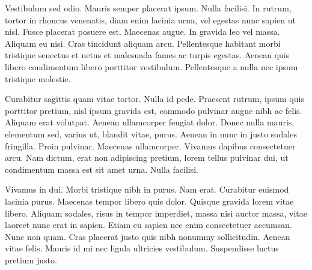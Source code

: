 Vestibulum sed odio. Mauris semper placerat ipsum. Nulla facilisi. In rutrum, tortor in rhoncus venenatis, diam enim lacinia urna, vel egestas nunc sapien ut nisl. Fusce placerat posuere est. Maecenas augue. In gravida leo vel massa. Aliquam eu nisi. Cras tincidunt aliquam arcu. Pellentesque habitant morbi tristique senectus et netus et malesuada fames ac turpis egestas. Aenean quis libero condimentum libero porttitor vestibulum. Pellentesque a nulla nec ipsum tristique molestie.

Curabitur sagittis quam vitae tortor. Nulla id pede. Praesent rutrum, ipsum quis porttitor pretium, nisl ipsum gravida est, commodo pulvinar augue nibh ac felis. Aliquam erat volutpat. Aenean ullamcorper feugiat dolor. Donec nulla mauris, elementum sed, varius ut, blandit vitae, purus. Aenean in nunc in justo sodales fringilla. Proin pulvinar. Maecenas ullamcorper. Vivamus dapibus consectetuer arcu. Nam dictum, erat non adipiscing pretium, lorem tellus pulvinar dui, ut condimentum massa est sit amet urna. Nulla facilisi.

Vivamus in dui. Morbi tristique nibh in purus. Nam erat. Curabitur euismod lacinia purus. Maecenas tempor libero quis dolor. Quisque gravida lorem vitae libero. Aliquam sodales, risus in tempor imperdiet, massa nisi auctor massa, vitae laoreet nunc erat in sapien. Etiam eu sapien nec enim consectetuer accumsan. Nunc non quam. Cras placerat justo quis nibh nonummy sollicitudin. Aenean vitae felis. Mauris id mi nec ligula ultricies vestibulum. Suspendisse luctus pretium justo. 
